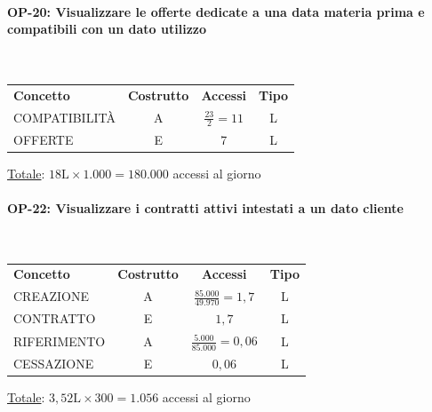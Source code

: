 \documentclass[a4paper,12pt]{report}
\begin{document}
\paragraph{OP-20: Visualizzare le offerte dedicate a una data materia prima e compatibili con un dato utilizzo}\mbox{}\\
    \begin{center}
    \begin{tabular}{@{}l c  c  c@{}}
        \hline
        \textbf{Concetto} & \textbf{Costrutto} & \textbf{Accessi} & \textbf{Tipo} \\ [0.5ex]
        COMPATIBILITÀ & A & $\frac{23}{2} = 11$ & L \\
        OFFERTE & E & 7 & L \\
        \hline
    \end{tabular}
    \end{center}
    \underline{Totale}: $18\text{L} \times 1.000 = 180.000$ accessi al giorno
\paragraph{OP-22: Visualizzare i contratti attivi intestati a un dato cliente}\mbox{}\\
\begin{center}
\begin{tabular}{@{}l c  c  c@{}}
    \hline
    \textbf{Concetto} & \textbf{Costrutto} & \textbf{Accessi} & \textbf{Tipo} \\ [0.5ex]
    CREAZIONE & A & $\frac{85.000}{49.970} = 1,7$ & L \\
    CONTRATTO & E & $1,7$ & L \\
    RIFERIMENTO & A & $\frac{5.000}{85.000} = 0,06$ & L \\
    CESSAZIONE & E & $0,06$ & L \\
    \hline
\end{tabular}
\end{center}
\underline{Totale}: $3,52\text{L} \times 300 = 1.056$ accessi al giorno
\end{document}
